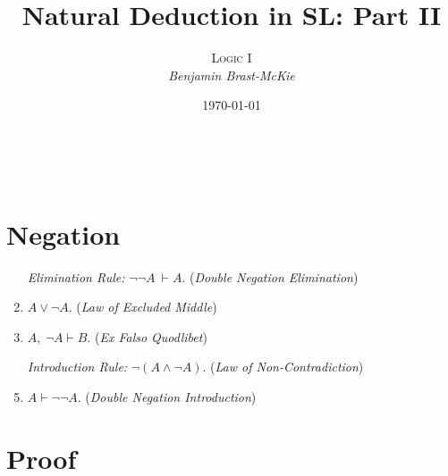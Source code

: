 \documentclass[a4paper, 11pt]{article} %
\title{\textbf{Natural Deduction in SL: Part II}} %
\author{\textsc{Logic I}\\ \em Benjamin Brast-McKie} %
\date{\today} %
\makeatletter
\renewcommand{\maketitle}{
\begin{flushright}
{\LARGE\@title}

\vspace{10pt}

{\@author}
\\ \@date
\end{flushright}

\vspace{20pt}

}
\makeatother
\begin{document}
\maketitle %

\thispagestyle{empty}



\section*{Negation}

\begin{enumerate}
  \item[\it Elimination Rule:] $\neg\neg A\ \vdash A$. \quad(\textit{Double Negation Elimination})
  \item $A \vee \neg A$. \quad(\textit{Law of Excluded Middle})
  \item $A,\ \neg A \vdash B$. \quad(\textit{Ex Falso Quodlibet})
  \item[\it Introduction Rule:] $\neg(A \wedge \neg A)$. \quad(\textit{Law of Non-Contradiction})
  \item $A \vdash \neg\neg A$. \quad(\textit{Double Negation Introduction}) 
\end{enumerate}






\section*{Proof}
\end{document}
